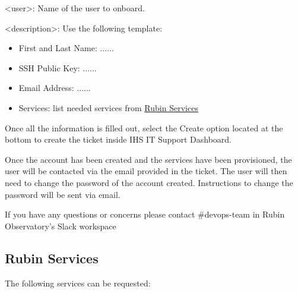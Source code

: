 <user>: Name of the user to onboard.

<description>: Use the following template:

\begin{itemize}
  \item First and Last Name: ......
  \item SSH Public Key: ......
  \item Email Address: ......
  \item Services: list needed services from \hyperref[sec:RubinServices]{Rubin Services}
\end{itemize}

Once all the information is filled out, select the Create option located at the bottom to create the ticket inside IHS IT Support Dashboard.

 Once the account has been created and the services have been provisioned, the user will be contacted via the email provided in the ticket. The user will then need to change the password of the account created. Instructions to change the password will be sent via email.

If you have any questions or concerns please contact \#devops-team in Rubin Observatory's Slack workspace
\newpage
\subsection{Rubin Services}
\label{sec:RubinServices}

The following services can be requested:

